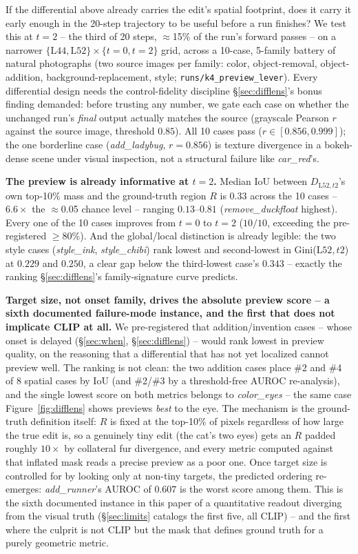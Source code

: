 \documentclass[10pt,twocolumn]{article}
\begin{document}
If the differential above already carries the edit's spatial
footprint, does it carry it early enough in the 20-step trajectory to
be useful before a run finishes? We test this at $t{=}2$ -- the third
of 20 steps, $\approx$15\% of the run's forward passes -- on a narrower
$\{\text{L44},\text{L52}\}\times\{t{=}0,t{=}2\}$ grid, across a 10-case,
5-family battery of natural photographs (two source images per family:
color, object-removal, object-addition, background-replacement, style;
\texttt{runs/k4\_preview\_lever}). Every differential design needs the
control-fidelity discipline \S\ref{sec:difflens}'s bonus finding
demanded: before trusting any number, we gate each case on whether the
unchanged run's \emph{final} output actually matches the source
(grayscale Pearson $r$ against the source image, threshold $0.85$). All
10 cases pass ($r\in[0.856, 0.999]$); the one borderline case
(\emph{add\_ladybug}, $r=0.856$) is texture divergence in a
bokeh-dense scene under visual inspection, not a structural failure
like \emph{car\_red}'s.

\textbf{The preview is already informative at $t{=}2$.} Median IoU
between $D_{\text{L52},t2}$'s own top-10\% mass and the ground-truth
region $R$ is $0.33$ across the 10 cases -- $6.6\times$ the
$\approx$0.05 chance level -- ranging $0.13$--$0.81$
(\emph{remove\_duckfloat} highest). Every one of the 10 cases improves
from $t{=}0$ to $t{=}2$ ($10/10$, exceeding the pre-registered
$\ge$80\%). And the global/local distinction is already legible: the
two style cases (\emph{style\_ink}, \emph{style\_chibi}) rank lowest
and second-lowest in Gini($\text{L52},t2$) at $0.229$ and $0.250$, a
clear gap below the third-lowest case's $0.343$ -- exactly the ranking
\S\ref{sec:difflens}'s family-signature curve predicts.

\textbf{Target size, not onset family, drives the absolute preview
score -- a sixth documented failure-mode instance, and the first that
does not implicate CLIP at all.} We pre-registered that
addition/invention cases -- whose onset is delayed
(\S\ref{sec:when}, \S\ref{sec:difflens}) -- would rank lowest in
preview quality, on the reasoning that a differential that has not yet
localized cannot preview well. The ranking is not clean: the two
addition cases place \#2 and \#4 of 8 spatial cases by IoU (and
\#2/\#3 by a threshold-free AUROC re-analysis), and the single lowest
score on both metrics belongs to \emph{color\_eyes} -- the same case
Figure~\ref{fig:difflens} shows previews \emph{best} to the eye. The
mechanism is the ground-truth definition itself: $R$ is fixed at the
top-10\% of pixels regardless of how large the true edit is, so a
genuinely tiny edit (the cat's two eyes) gets an $R$ padded roughly
$10\times$ by collateral fur divergence, and every metric computed
against that inflated mask reads a precise preview as a poor one. Once
target size is controlled for by looking only at non-tiny targets, the
predicted ordering re-emerges: \emph{add\_runner}'s AUROC of $0.607$ is
the worst score among them. This is the sixth documented instance in
this paper of a quantitative readout diverging from the visual truth
(\S\ref{sec:limits} catalogs the first five, all CLIP) -- and the first
where the culprit is not CLIP but the mask that defines ground truth
for a purely geometric metric.
\end{document}
